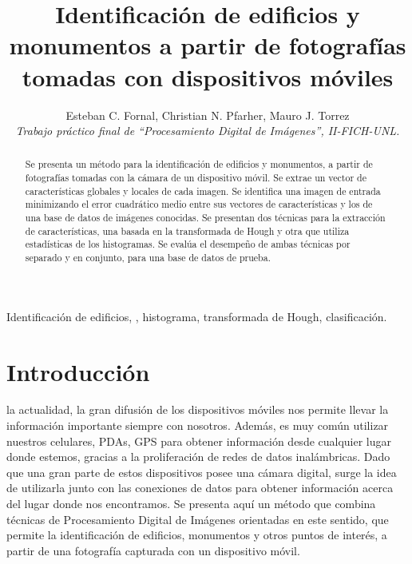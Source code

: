 \documentclass[conference,a4paper,10pt,oneside,final]{tfmpd}
\begin{document}
\title{Identificación de edificios y monumentos a partir de fotografías
tomadas con dispositivos móviles}
\author{Esteban C. Fornal, Christian N. Pfarher, Mauro J. Torrez\\
\textit{Trabajo práctico final de ``Procesamiento Digital de
Imágenes'', II-FICH-UNL.}}
\maketitle
%
%
%
%
\begin{abstract}
Se presenta un método para la identificación de edificios y monumentos, a
partir de fotografías tomadas con la cámara de un dispositivo móvil.
Se extrae un vector de características {globales y locales} de cada imagen.
{Se identifica una imagen de entrada minimizando el error cuadrático medio
entre sus vectores de características y los de una base de datos de imágenes
conocidas.}
Se presentan dos técnicas para la extracción de
características, una basada en la transformada de Hough y otra que
utiliza estadísticas de los histogramas.
Se evalúa el desempeño de ambas técnicas por separado y en
conjunto, para una base de datos de prueba.
\end{abstract}
%
%
%
%
\begin{keywords}
Identificación de edificios, ,
histograma, transformada de Hough, clasificación.
\end{keywords}
%
%
%
%
\section{Introducción}
 la actualidad, la gran difusión de los dispositivos móviles nos
permite llevar la información importante siempre con nosotros. Además, es muy
común utilizar nues\-tros celulares, PDAs, GPS para obtener
información desde cualquier lugar donde estemos, gracias a la proliferación de
redes de datos inalámbricas. Dado que una gran parte de estos dispositivos
posee una cámara
digital, surge la idea de utilizarla junto con las conexiones de datos para
obtener información acerca del lugar donde nos encontramos. Se presenta aquí
un método que combina técnicas de Procesa\-mien\-to Digital de Imágenes
orientadas en este sentido, que permite la
identificación de edificios, monumentos y otros puntos de interés, a partir
de una fotografía capturada con un dispositivo móvil.
%
%
%
%
\end{document}
